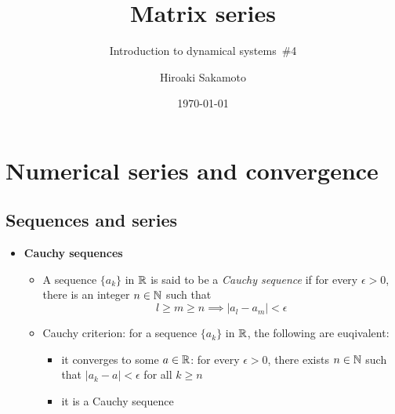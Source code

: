 \documentclass[12pt,a4paper]{article}
\title{Matrix series}
\subtitle{Introduction to dynamical systems~\#4}
\author{Hiroaki Sakamoto}
\date{\today}
\begin{document}
\maketitle
\tableofcontents

\section{Numerical series and convergence}

\subsection{Sequences and series}

\begin{itemize}
\item \textbf{Cauchy sequences}
  \begin{itemize}
  \item A sequence $\{a_{k}\}$ in $\mathbb{R}$ is said to be a \emph{Cauchy sequence}
    if for every $\epsilon>0$, there is an integer $n\in \mathbb{N}$ such that
    \begin{equation}\nonumber%
      l\geq m\geq n  \implies |a_{l} - a_{m}|<\epsilon
    \end{equation}
  \item Cauchy criterion: for a sequence $\{a_{k}\}$ in $\mathbb{R}$, the following are euqivalent:
    \begin{itemize}
    \item it converges to some $a \in \mathbb{R}$: for every $\epsilon > 0$, there exists $n\in \mathbb{N}$ such that
      $|a_{k}-a|<\epsilon$ for all $k\geq n$
    \item it is a Cauchy sequence
    \end{itemize}
  \end{itemize}


\end{itemize}
\end{document}
